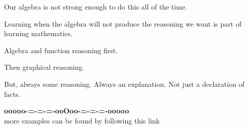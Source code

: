 \documentclass{ximera}
\begin{document}
Our algebra is not strong enough to do this all of the time.





Learning when the algebra will not produce the reasoning we want is part of learning mathematics.  

Algebra and function reasoning first. 

Then graphical reasoning.  


But, always some reasoning.  Always an explanation. Not just a declaration of facts.








\begin{center}
\textbf{\textcolor{green!50!black}{ooooo-=-=-=-ooOoo-=-=-=-ooooo}} \\

more examples can be found by following this link\\ 

\end{center}
\end{document}
